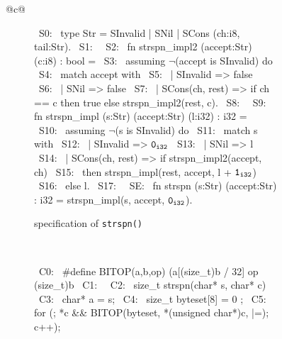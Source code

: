\begin{figure}[t!]
\begin{tabular}{@{}c@{}}
\begin{subfigure}[b]{\textwidth}
\begin{center}
\begin{allLangEnvFoot}
~{\tiny \textcolor{mygray}{S0:\phantom{ }}}~ type Str = SInvalid | SNil | SCons (ch:i8, tail:Str).
~{\tiny \textcolor{mygray}{S1:\phantom{ }}}~ 
~{\tiny \textcolor{mygray}{S2:\phantom{ }}}~ fn strspn_impl2 (accept:Str) (c:i8) : bool =
~{\tiny \textcolor{mygray}{S3:\phantom{ }}}~   assuming $\neg$(accept is SInvalid) do
~{\tiny \textcolor{mygray}{S4:\phantom{ }}}~   match accept with
~{\tiny \textcolor{mygray}{S5:\phantom{ }}}~   | SInvalid => false
~{\tiny \textcolor{mygray}{S6:\phantom{ }}}~   | SNil => false
~{\tiny \textcolor{mygray}{S7:\phantom{ }}}~   | SCons(ch, rest) => if ch == c then true else strspn_impl2(rest, c).
~{\tiny \textcolor{mygray}{S8:\phantom{ }}}~ 
~{\tiny \textcolor{mygray}{S9:\phantom{ }}}~ fn strspn_impl (s:Str) (accept:Str) (l:i32) : i32 =
~{\tiny \textcolor{mygray}{S10:}}~   assuming $\neg$(s is SInvalid) do
~{\tiny \textcolor{mygray}{S11:}}~   match s with
~{\tiny \textcolor{mygray}{S12:}}~   | SInvalid => ${\tt 0_{i32}}$
~{\tiny \textcolor{mygray}{S13:}}~   | SNil => l
~{\tiny \textcolor{mygray}{S14:}}~   | SCons(ch, rest) => if strspn_impl2(accept, ch)
~{\tiny \textcolor{mygray}{S15:}}~                        then strspn_impl(rest, accept, l + ${\tt 1_{i32}}$)
~{\tiny \textcolor{mygray}{S16:}}~                        else l.
~{\tiny \textcolor{mygray}{S17:}}~ 
~{\tiny \textcolor{mygray}{SE:\phantom{ }}}~ fn strspn (s:Str) (accept:Str) : i32 = strspn_impl(s, accept, ${\tt 0_{i32}}$).
\end{allLangEnvFoot}
\end{center}
\caption{\label{fig:limitationExStrspnSpec}\SpecL{} specification of {\tt strspn()}}
\end{subfigure}%
\\
\begin{subfigure}[b]{\textwidth}
\begin{center}
\begin{allLangEnvFoot}
~{\tiny \textcolor{mygray}{C0:}}~ #define BITOP(a,b,op) (a[(size_t)b / 32] op (size_t)b %
~{\tiny \textcolor{mygray}{C1:}}~ 
~{\tiny \textcolor{mygray}{C2:}}~ size_t strspn(char* s, char* c) {
~{\tiny \textcolor{mygray}{C3:}}~   char* a = s;
~{\tiny \textcolor{mygray}{C4:}}~   size_t byteset[8] = { 0 };
~{\tiny \textcolor{mygray}{C5:}}~   for (; *c && BITOP(byteset, *(unsigned char*)c, |=); c++);
}
\end{allLangEnvFoot}
\end{center}
\end{subfigure}
\end{tabular}
\end{figure}
